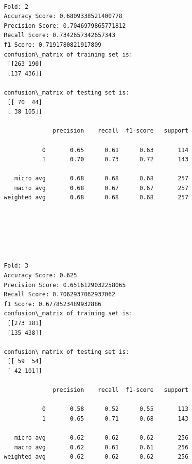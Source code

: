\documentclass[11pt]{article}
\begin{document}
    \begin{Verbatim}[commandchars=\\\{\}]

Fold: 2
Accuracy Score: 0.6809338521400778
Precision Score: 0.7046979865771812
Recall Score: 0.7342657342657343
f1 Score: 0.7191780821917809
confusion\_matrix of training set is: 
 [[263 190]
 [137 436]] 

confusion\_matrix of testing set is: 
 [[ 70  44]
 [ 38 105]] 

              precision    recall  f1-score   support

           0       0.65      0.61      0.63       114
           1       0.70      0.73      0.72       143

   micro avg       0.68      0.68      0.68       257
   macro avg       0.68      0.67      0.67       257
weighted avg       0.68      0.68      0.68       257


    \end{Verbatim}

    \begin{center}
    \end{center}
    { \hspace*{\fill} \\}
    
    \begin{center}
    \end{center}
    { \hspace*{\fill} \\}
    
    \begin{Verbatim}[commandchars=\\\{\}]

Fold: 3
Accuracy Score: 0.625
Precision Score: 0.6516129032258065
Recall Score: 0.7062937062937062
f1 Score: 0.6778523489932886
confusion\_matrix of training set is: 
 [[273 181]
 [135 438]] 

confusion\_matrix of testing set is: 
 [[ 59  54]
 [ 42 101]] 

              precision    recall  f1-score   support

           0       0.58      0.52      0.55       113
           1       0.65      0.71      0.68       143

   micro avg       0.62      0.62      0.62       256
   macro avg       0.62      0.61      0.61       256
weighted avg       0.62      0.62      0.62       256


    \end{Verbatim}
\end{document}
